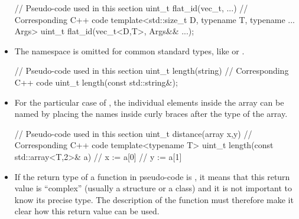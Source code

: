 \documentclass[12pt]{report}
\newenvironment{example}
{
    \begin{mdframed}[style=example,frametitle={Example}]
}
{
    \end{mdframed}
}
\begin{document}
\begin{itemize}
\begin{example}
\begin{cppcode}
// Pseudo-code used in this section
uint_t flat_id(vec_t, ...)
// Corresponding C++ code
template<std::size_t D, typename T, typename ... Args>
uint_t flat_id(vec_t<D,T>, Args&& ...);
\end{cppcode}
\end{example}

\item The  namespace is omitted for common standard types, like  or .

\begin{example}
\begin{cppcode}
// Pseudo-code used in this section
uint_t length(string)
// Corresponding C++ code
uint_t length(const std::string&);
\end{cppcode}
\end{example}

\item For the particular case of , the individual elements inside the array can be named by placing the names inside curly braces after the type of the array.

\begin{example}
\begin{cppcode}
// Pseudo-code used in this section
uint_t distance(array {x,y})
// Corresponding C++ code
template<typename T>
uint_t length(const std::array<T,2>& a) {
    // x := a[0]
    // y := a[1]
}
\end{cppcode}
\end{example}

\item If the return type of a function in pseudo-code is , it means that this return value is ``complex'' (usually a structure or a class) and it is not important to know its precise type. The description of the function must therefore make it clear how this return value can be used.

\end{itemize}
\end{document}
